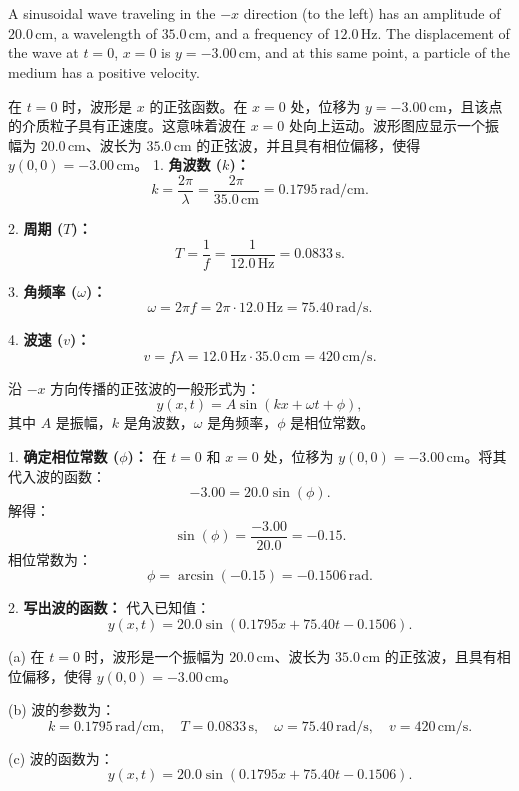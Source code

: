 \chapter[振动与波]{}
\begin{solution}
    A sinusoidal wave traveling in the $-x$ direction (to the left) has an amplitude of $20.0 \, \text{cm}$, a wavelength of $35.0 \, \text{cm}$, and a frequency of $12.0 \, \text{Hz}$. The displacement of the wave at $t = 0$, $x = 0$ is $y = -3.00 \, \text{cm}$, and at this same point, a particle of the medium has a positive velocity.

    \tcbrule

		在 \( t = 0 \) 时，波形是 \( x \) 的正弦函数。在 \( x = 0 \) 处，位移为 \( y = -3.00 \, \text{cm} \)，且该点的介质粒子具有正速度。这意味着波在 \( x = 0 \) 处向上运动。波形图应显示一个振幅为 \( 20.0 \, \text{cm} \)、波长为 \( 35.0 \, \text{cm} \) 的正弦波，并且具有相位偏移，使得 \( y(0, 0) = -3.00 \, \text{cm} \)。
		1. \textbf{角波数 (\( k \))：}
		\[
		k = \frac{2\pi}{\lambda} = \frac{2\pi}{35.0 \, \text{cm}} = 0.1795 \, \text{rad/cm}.
		\]

		2. \textbf{周期 (\( T \))：}
		\[
		T = \frac{1}{f} = \frac{1}{12.0 \, \text{Hz}} = 0.0833 \, \text{s}.
		\]

		3. \textbf{角频率 (\( \omega \))：}
		\[
		\omega = 2\pi f = 2\pi \cdot 12.0 \, \text{Hz} = 75.40 \, \text{rad/s}.
		\]

		4. \textbf{波速 (\( v \))：}
		\[
		v = f \lambda = 12.0 \, \text{Hz} \cdot 35.0 \, \text{cm} = 420 \, \text{cm/s}.
		\]

		沿 \(-x\) 方向传播的正弦波的一般形式为：
		\[
		y(x, t) = A \sin(kx + \omega t + \phi),
		\]
		其中 \( A \) 是振幅，\( k \) 是角波数，\( \omega \) 是角频率，\( \phi \) 是相位常数。

		1. \textbf{确定相位常数 (\( \phi \))：}
		在 \( t = 0 \) 和 \( x = 0 \) 处，位移为 \( y(0, 0) = -3.00 \, \text{cm} \)。将其代入波的函数：
		\[
		-3.00 = 20.0 \sin(\phi).
		\]
		解得：
		\[
		\sin(\phi) = \frac{-3.00}{20.0} = -0.15.
		\]
		相位常数为：
		\[
		\phi = \arcsin(-0.15) = -0.1506 \, \text{rad}.
		\]

		2. \textbf{写出波的函数：}
		代入已知值：
		\[
		y(x, t) = 20.0 \sin(0.1795x + 75.40t - 0.1506).
		\]

		(a) 在 \( t = 0 \) 时，波形是一个振幅为 \( 20.0 \, \text{cm} \)、波长为 \( 35.0 \, \text{cm} \) 的正弦波，且具有相位偏移，使得 \( y(0, 0) = -3.00 \, \text{cm} \)。

		(b) 波的参数为：
		\[
		k = 0.1795 \, \text{rad/cm}, \quad T = 0.0833 \, \text{s}, \quad \omega = 75.40 \, \text{rad/s}, \quad v = 420 \, \text{cm/s}.
		\]

		(c) 波的函数为：
		\[
		y(x, t) = 20.0 \sin(0.1795x + 75.40t - 0.1506).
		\]
\end{solution}

